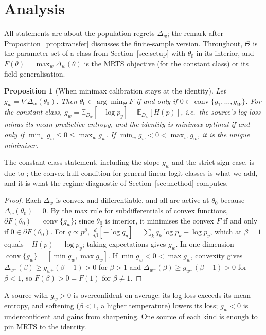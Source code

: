 \documentclass[11pt]{article}
\newtheorem{proposition}{Proposition}
\theoremstyle{remark}
\newcommand{\E}{\mathbb{E}}
\newcommand{\conv}{\operatorname{conv}}
\begin{document}
\section{Analysis}\label{sec:theory}
All statements are about the population regrets $\Delta_w$; the remark after Proposition~\ref{prop:transfer} discusses the finite-sample version.
Throughout, $\Theta$ is the parameter set of a class from Section~\ref{sec:setup} with $\theta_0$ in its interior, and $F(\theta)=\max_w\Delta_w(\theta)$ is the MRTS objective (for the constant class) or its field generalisation.

\begin{proposition}[When minimax calibration stays at the identity]\label{prop:stuck}
Let $g_w=\nabla\Delta_w(\theta_0)$.
Then $\theta_0\in\arg\min_{\Theta}F$ if and only if $0\in\conv\{g_1,\dots,g_W\}$.
For the constant class, $g_w=\E_{D_w}[-\log p_y]-\E_{D_w}[H(p)]$, i.e.\ the source's log-loss minus its mean predictive entropy, and the identity is minimax-optimal if and only if $\min_w g_w\le 0\le\max_w g_w$.
If $\min_w g_w<0<\max_w g_w$, it is the unique minimiser.
\end{proposition}
The constant-class statement, including the slope $g_w$ and the strict-sign case, is due to \citet{calport2026}; the convex-hull condition for general linear-logit classes is what we add, and it is what the regime diagnostic of Section~\ref{sec:method} computes.
\begin{proof}
Each $\Delta_w$ is convex and differentiable, and all are active at $\theta_0$ because $\Delta_w(\theta_0)=0$.
By the max rule for subdifferentials of convex functions, $\partial F(\theta_0)=\conv\{g_w\}$; since $\theta_0$ is interior, it minimises the convex $F$ if and only if $0\in\partial F(\theta_0)$.
For $q\propto p^\beta$, $\frac{d}{d\beta}[-\log q_y]=\sum_k q_k\log p_k-\log p_y$, which at $\beta=1$ equals $-H(p)-\log p_y$; taking expectations gives $g_w$.
In one dimension $\conv\{g_w\}=[\min g_w,\max g_w]$.
If $\min g_w<0<\max g_w$, convexity gives $\Delta_{w^+}(\beta)\ge g_{w^+}(\beta-1)>0$ for $\beta>1$ and $\Delta_{w^-}(\beta)\ge g_{w^-}(\beta-1)>0$ for $\beta<1$, so $F(\beta)>0=F(1)$ for $\beta\ne1$.
\end{proof}
A source with $g_w>0$ is overconfident on average: its log-loss exceeds its mean entropy, and softening ($\beta<1$, a higher temperature) lowers its loss; $g_w<0$ is underconfident and gains from sharpening.
One source of each kind is enough to pin MRTS to the identity.
\end{document}
